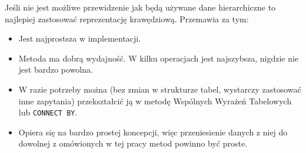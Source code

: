Jeśli nie jest możliwe przewidzenie jak będą używane dane hierarchiczne to najlepiej zastosować reprezentację krawędziową.
Przemawia za tym:
\begin{itemize}
  	\item
    	Jest najprostsza w implementacji.
  	\item 
  		Metoda ma dobrą wydajność. W kilku operacjach jest najszybsza, nigdzie nie jest bardzo powolna.
  	\item
  		W razie potrzeby można (bez zmian w strukturze tabel, wystarczy zastosować inne zapytania) przekształcić ją w metodę Wspólnych Wyrażeń Tabelowych lub \texttt{CONNECT BY}.
  	\item 
  		Opiera się na bardzo prostej koncepcji, więc przeniesienie danych z niej do dowolnej z omówionych w tej pracy metod powinno być proste.
\end{itemize}




